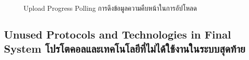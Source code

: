 
\begin{figure}[h]
    \begin{center}
    
    \end{center}
    \newcommand{\UploadProgressPolling}{\ifenglish Upload Progress Polling \else การดึงข้อมูลความคืบหน้าในการอัปโหลด \fi}
    \caption[\UploadProgressPolling]{\UploadProgressPolling}
    \label{fig directory upload quence}
\end{figure}

\subsection{\ifenglish Unused Protocols and Technologies in Final System \else โปรโตคอลและเทคโนโลยีที่ไม่ได้ใช้งานในระบบสุดท้าย \fi}